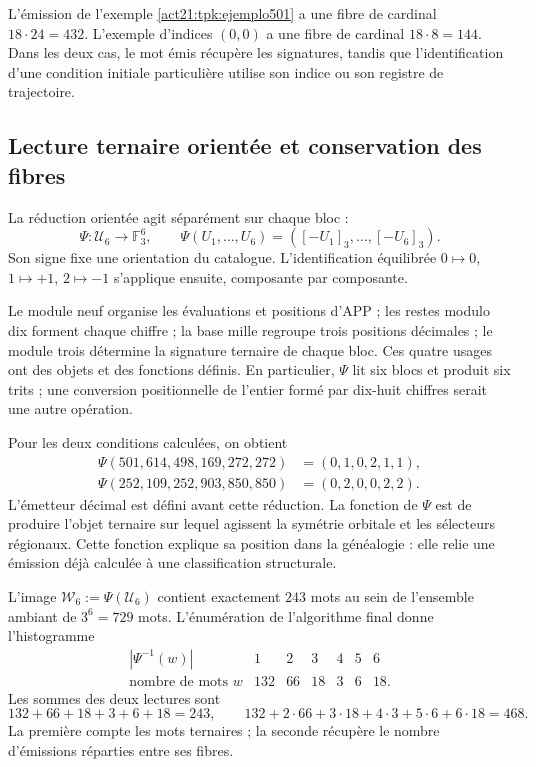 L'émission de l'exemple \ref{act21:tpk:ejemplo501} a une fibre de cardinal
\(18\cdot24=432\). L'exemple d'indices \((0,0)\) a une fibre de
cardinal \(18\cdot8=144\). Dans les deux cas, le mot émis récupère
les signatures, tandis que l'identification d'une condition initiale particulière
utilise son indice ou son registre de trajectoire.

\subsection{Lecture ternaire orientée et conservation des fibres}
\label{act21:tpk:reduccion-ternaria}

La réduction orientée agit séparément sur chaque bloc :
\begin{equation}
 \Psi:\mathcal U_6\longrightarrow\mathbb F_3^6,\qquad
 \Psi(U_1,\ldots,U_6)=([-U_1]_3,\ldots,[-U_6]_3).
 \label{act21:tpk:psi}
\end{equation}
Son signe fixe une orientation du catalogue. L'identification équilibrée
\(0\mapsto0\), \(1\mapsto+1\), \(2\mapsto-1\) s'applique ensuite,
composante par composante.

Le module neuf organise les évaluations et positions d'APP ; les restes modulo dix forment chaque chiffre ; la base mille regroupe trois positions décimales ; le module trois détermine la signature ternaire de chaque bloc. Ces quatre usages ont des objets et des fonctions définis. En particulier, \(\Psi\) lit six blocs et produit six trits ; une conversion positionnelle de l'entier formé par dix-huit chiffres serait une autre opération.

Pour les deux conditions calculées, on obtient
\begin{align*}
 \Psi(501,614,498,169,272,272)&=(0,1,0,2,1,1),\\
 \Psi(252,109,252,903,850,850)&=(0,2,0,0,2,2).
\end{align*}
L'émetteur décimal est défini avant cette réduction. La fonction de
\(\Psi\) est de produire l'objet ternaire sur lequel agissent la symétrie
orbitale et les sélecteurs régionaux. Cette fonction explique sa position dans la
généalogie : elle relie une émission déjà calculée à une classification structurale.

L'image \(\mathcal W_6:=\Psi(\mathcal U_6)\) contient exactement
\(243\) mots au sein de l'ensemble ambiant de \(3^6=729\) mots.
L'énumération de l'algorithme final donne l'histogramme
\begin{equation}
\begin{array}{c|rrrrrr}
 |\Psi^{-1}(w)|&1&2&3&4&5&6\\\hline
 \text{nombre de mots }w&132&66&18&3&6&18.
\end{array}
\label{act21:tpk:fibras-ternarias}
\end{equation}
Les sommes des deux lectures sont
\[
132+66+18+3+6+18=243,
\qquad132+2\cdot66+3\cdot18+4\cdot3+5\cdot6+6\cdot18=468.
\]
La première compte les mots ternaires ; la seconde récupère le nombre d'émissions réparties entre ses fibres.

